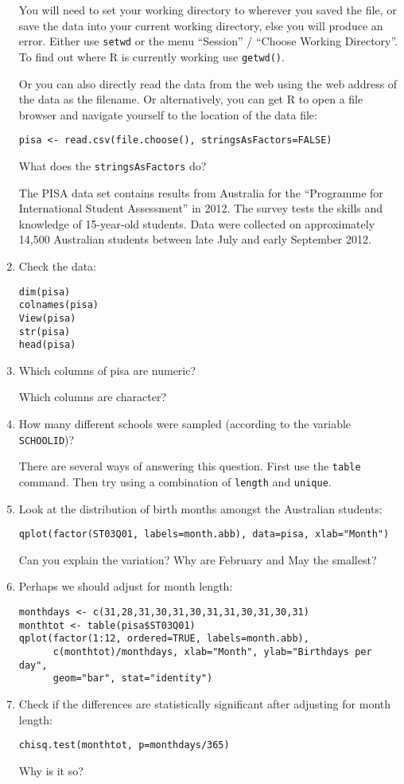 \documentclass[11pt]{article}
\begin{document}
\begin{enumerate}
You will need to set your working directory to wherever you saved the file, or save the data into your current working directory, else you will produce an error.  Either use \verb|setwd| or the menu ``Session'' / ``Choose Working Directory''. To find out where R is currently working use \verb|getwd()|.

Or you can also directly read the data from the web using the web address of the data as the filename. 
Or alternatively, you can get R to open a file browser and navigate yourself  to the location of the data file:

\begin{verbatim}
pisa <- read.csv(file.choose(), stringsAsFactors=FALSE)
\end{verbatim}

What does the \verb|stringsAsFactors| do?

The PISA data set contains results from Australia for the ``Programme for International Student Assessment'' in 2012. The survey tests the skills and knowledge of 15-year-old students. Data were collected on approximately 14,500 Australian students between late July and early September 2012.

\item Check the data:
\begin{verbatim}
dim(pisa)
colnames(pisa)
View(pisa)
str(pisa)
head(pisa)
\end{verbatim}

\item Which columns of pisa are numeric?

Which columns are character?

\item How many different schools were sampled (according to the variable \verb|SCHOOLID|)?

There are several ways of answering this question. First use the \verb|table| command. Then try using a combination of \verb|length| and \verb|unique|.


\item Look at the distribution of birth months amongst the Australian students:
\begin{verbatim}
qplot(factor(ST03Q01, labels=month.abb), data=pisa, xlab="Month")
\end{verbatim}
Can you explain the variation? Why are February and May the smallest?

\item Perhaps we should adjust for month length:
\begin{verbatim}
monthdays <- c(31,28,31,30,31,30,31,31,30,31,30,31)
monthtot <- table(pisa$ST03Q01)
qplot(factor(1:12, ordered=TRUE, labels=month.abb), 
      c(monthtot)/monthdays, xlab="Month", ylab="Birthdays per day",
      geom="bar", stat="identity")
\end{verbatim}
\item Check if the differences are statistically significant after adjusting for month length:
\begin{verbatim}
chisq.test(monthtot, p=monthdays/365)
\end{verbatim}
Why is it so?


\end{enumerate}
\end{document}
